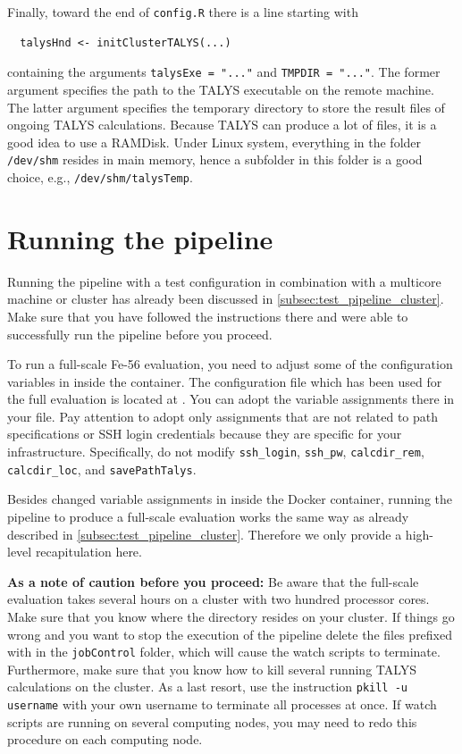 \documentclass[12pt,a4paper]{scrartcl}
\begin{document}
\noindent Finally, toward the end of \verb#config.R# there is a line starting with 
 \begin{verbatim}
  talysHnd <- initClusterTALYS(...)
\end{verbatim}containing the arguments \verb#talysExe = "..."# and \verb#TMPDIR = "..."#.
The former argument specifies the path to the TALYS executable on the remote machine.
The latter argument specifies the temporary directory to store the result files of ongoing TALYS calculations.
Because TALYS can produce a lot of files, it is a good idea to use a RAMDisk.
Under Linux system, everything in the folder \verb#/dev/shm# resides in main memory, hence a subfolder in this folder is a good choice, e.g., \verb#/dev/shm/talysTemp#.

 \section{Running the pipeline}
 Running the pipeline with a test configuration in combination with a multicore machine or cluster has already been discussed in \cref{subsec:test_pipeline_cluster}.
Make sure that you have followed the instructions there and were able to successfully run the pipeline before you proceed.

 To run a full-scale Fe-56 evaluation, you need to adjust some of the configuration variables in  inside the container.
 The configuration file which has been used for the full evaluation is located at .
 You can adopt the variable assignments there in your  file.
 Pay attention to adopt only assignments that are not related to path specifications or SSH login credentials because they are specific for your infrastructure.
 Specifically, do not modify \verb#ssh_login#, \verb#ssh_pw#, \verb#calcdir_rem#, \verb#calcdir_loc#, and \verb#savePathTalys#.

Besides changed variable assignments in  inside the Docker container, running the pipeline to produce a full-scale evaluation works the same way as already described in \cref{subsec:test_pipeline_cluster}.
Therefore we only provide a high-level recapitulation here.
\vspace{2ex}

\textbf{As a note of caution before you proceed:} Be aware that the full-scale evaluation takes several hours on a cluster with two hundred processor cores.
Make sure that you know where the  directory resides on your cluster.
If things go wrong and you want to stop the execution of the pipeline delete the files prefixed with  in the \verb#jobControl# folder, which will cause the watch scripts to terminate.
Furthermore, make sure that you know how to kill several running TALYS calculations on the cluster.
As a last resort, use the instruction \verb#pkill -u username# with your own username to terminate all processes at once.
If watch scripts are running on several computing nodes, you may need to redo this procedure on each computing node.
\end{document}
